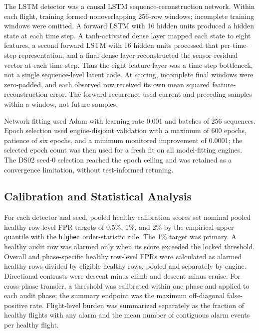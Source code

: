 \documentclass[preprint,12pt]{elsarticle}
\begin{document}
The LSTM detector was a causal LSTM sequence-reconstruction network. Within each flight, training formed nonoverlapping 256-row windows; incomplete training windows were omitted. A forward LSTM with 16 hidden units produced a hidden state at each time step. A tanh-activated dense layer mapped each state to eight features, a second forward LSTM with 16 hidden units processed that per-time-step representation, and a final dense layer reconstructed the sensor-residual vector at each time step. Thus the eight-feature layer was a time-step bottleneck, not a single sequence-level latent code. At scoring, incomplete final windows were zero-padded, and each observed row received its own mean squared feature-reconstruction error. The forward recurrence used current and preceding samples within a window, not future samples.

Network fitting used Adam with learning rate 0.001 and batches of 256 sequences. Epoch selection used engine-disjoint validation with a maximum of 600 epochs, patience of six epochs, and a minimum monitored improvement of 0.0001; the selected epoch count was then used for a fresh fit on all model-fitting engines. The DS02 seed-0 selection reached the epoch ceiling and was retained as a convergence limitation, without test-informed retuning.

\subsection{Calibration and Statistical Analysis}\label{calibration-and-statistical-analysis}

For each detector and seed, pooled healthy calibration scores set nominal pooled healthy row-level FPR targets of 0.5\%, 1\%, and 2\% by the empirical upper quantile with the \texttt{higher} order-statistic rule. The 1\% target was primary. A healthy audit row was alarmed only when its score exceeded the locked threshold. Overall and phase-specific healthy row-level FPRs were calculated as alarmed healthy rows divided by eligible healthy rows, pooled and separately by engine. Directional contrasts were descent minus climb and descent minus cruise. For cross-phase transfer, a threshold was calibrated within one phase and applied to each audit phase; the summary endpoint was the maximum off-diagonal false-positive rate. Flight-level burden was summarized separately as the fraction of healthy flights with any alarm and the mean number of contiguous alarm events per healthy flight.
\end{document}
